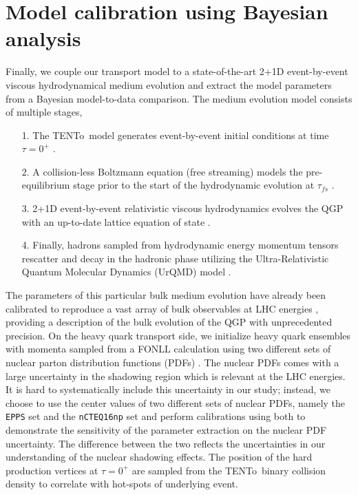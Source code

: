 \documentclass[aps, prc, reprint, amsmath, groupedaddress, nofootinbib]{revtex4-1}
\newcommand{\trento}{T\raisebox{-0.5ex}{R}ENTo}
\begin{document}
\section{Model calibration using Bayesian analysis}\label{section:calibration}
Finally, we couple our transport model to a state-of-the-art 2+1D event-by-event viscous hydrodynamical medium evolution and extract the model parameters from a Bayesian model-to-data comparison.
The medium evolution model consists of multiple stages,
\begin{itemize}
\item[1.] The \trento\ model generates event-by-event initial conditions at time $\tau = 0^+$ \cite{Moreland:2014oya}. 
\item[2.] A collision-less Boltzmann equation (free streaming) models the pre-equilibrium stage prior to the start of the hydrodynamic evolution at $\tau_{fs}$ \cite{Liu:2015nwa}.
\item[3.] 2+1D event-by-event relativistic viscous hydrodynamics evolves the QGP with an up-to-date lattice equation of state \cite{Shen:2014vra, Bazavov:2014pvz}.
\item[4.] Finally, hadrons sampled from hydrodynamic energy momentum tensors rescatter and decay in the hadronic phase utilizing the Ultra-Relativistic Quantum Molecular Dynamics (UrQMD) model \cite{Bass:1998ca, Bleicher:1999xi}.
\end{itemize}
The parameters of this particular bulk medium evolution have already been calibrated to reproduce a vast array of bulk observables at LHC energies \cite{Bernhard:}, providing a description of the bulk evolution of the QGP with unprecedented precision.
On the heavy quark transport side, we initialize heavy quark ensembles with momenta sampled from a FONLL calculation using two different sets of nuclear parton distribution functions (PDFs) \cite{Cacciari:1998it,Kovarik:2015cma,Eskola:2016oht}. 
The nuclear PDFs comes with a large uncertainty in the shadowing region which is relevant at the LHC energies.
It is hard to systematically include this uncertainty in our study; instead, we choose to use the center values of two different sets of nuclear PDFs, namely the {\tt EPPS} set and the {\tt nCTEQ16np} set and perform calibrations using both to demonstrate the sensitivity of the parameter extraction on the nuclear PDF uncertainty.
The difference between the two  reflects the uncertainties in our understanding of the nuclear shadowing effects.
The position of the hard production vertices at $\tau = 0^+$ are sampled from the \trento\ binary collision density to correlate with hot-spots of  underlying event. 
\end{document}
